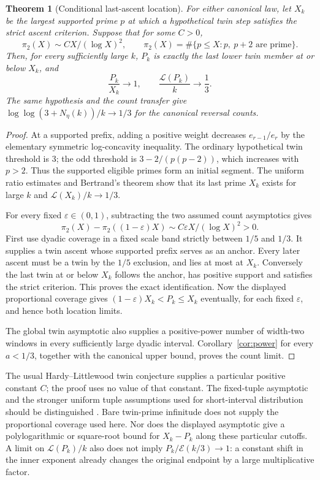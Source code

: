 \documentclass[11pt]{article}
\newtheorem{theorem}{Theorem}[section]
\theoremstyle{definition}
\newcommand{\LL}{\mathcal L}
\newcommand{\EE}{\mathcal E}
\begin{document}
\begin{theorem}[Conditional last-ascent location]\label{thm:hl-location}
For either canonical law, let $X_k$ be the largest supported prime
$p$ at which a hypothetical twin step satisfies the strict ascent
criterion. Suppose that for some $C>0$,
\[
 \pi_2(X)\sim C X/(\log X)^2,
 \qquad
 \pi_2(X)=\#\{p\le X:p,\ p+2\text{ are prime}\}.
\]
Then, for every sufficiently large $k$, $P_k$ is exactly the last
lower twin member at or below $X_k$, and
\[
 \frac{P_k}{X_k}\longrightarrow1,\qquad
 \frac{\LL(P_k)}k\longrightarrow\frac13 .
\]
The same hypothesis and the count transfer give
$\log\log(3+N_\eta(k))/k\to1/3$ for the canonical reversal counts.
\end{theorem}
\begin{proof}
At a supported prefix, adding a positive weight decreases
$e_{r-1}/e_r$ by the elementary symmetric log-concavity inequality.
The ordinary hypothetical twin threshold is $3$; the odd threshold
is $3-2/(p(p-2))$, which increases with $p>2$.
Thus the supported eligible primes form an initial segment.
The uniform ratio estimates and Bertrand's theorem show that its
last prime $X_k$ exists for large $k$ and $\LL(X_k)/k\to1/3$.

For every fixed $\varepsilon\in(0,1)$, subtracting the two assumed
count asymptotics gives
\[
 \pi_2(X)-\pi_2((1-\varepsilon)X)
       \sim C\varepsilon X/(\log X)^2>0.
\]
First use dyadic coverage in a fixed scale band strictly between
$1/5$ and $1/3$. It supplies a twin ascent whose supported prefix
serves as an anchor. Every later ascent must be a twin by the
$1/5$ exclusion, and lies at most at $X_k$.
Conversely the last twin at or below $X_k$ follows the anchor,
has positive support and satisfies the strict criterion.
This proves the exact identification.
Now the displayed proportional coverage gives
$(1-\varepsilon)X_k<P_k\le X_k$ eventually, for each fixed
$\varepsilon$, and hence both location limits.

The global twin asymptotic also supplies a positive-power number of
width-two windows in every sufficiently large dyadic interval.
Corollary~\ref{cor:power} for every $a<1/3$, together with the
canonical upper bound, proves the count limit.
\end{proof}
The usual Hardy--Littlewood twin conjecture supplies a particular
positive constant $C$; the proof uses no value of that constant.
The fixed-tuple asymptotic and the stronger uniform tuple assumptions
used for short-interval distribution should be distinguished
\cite[(1) and Theorem~1]{Gallagher}.
Bare twin-prime infinitude does not supply the proportional coverage
used here. Nor does the displayed asymptotic give a polylogarithmic
or square-root bound for $X_k-P_k$ along these particular cutoffs.
A limit on $\LL(P_k)/k$ also does not imply
$P_k/\EE(k/3)\to1$: a constant shift in the inner exponent already
changes the original endpoint by a large multiplicative factor.
\end{document}
